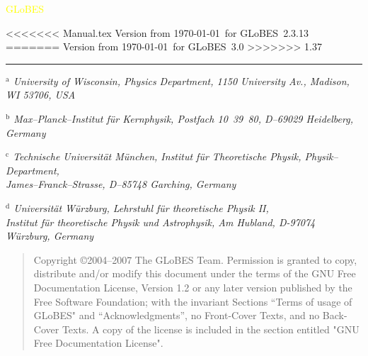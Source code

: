 \documentclass[a4paper,12pt,twoside]{book}
\newcommand{\GLOBES}{{\sf GLoBES}}
\begin{document}
{\begin{center}
\vspace*{-1cm}

{\Huge \textcolor{yellow}{GLoBES}}
\end{center}

\vspace{1cm}

\begin{center}
<<<<<<< Manual.tex
Version from \today\ for \GLOBES\ 2.3.13
=======
Version from \today\ for \GLOBES\ 3.0
>>>>>>> 1.37
\end{center}


\vspace*{0.5cm}
\vfill
\hrule

\vspace*{0.1cm}

{\em\small $^{\mathrm{a}}$%
       University of Wisconsin,  Physics Department,
       1150 University Av., Madison, WI 53706, USA}

{\em\small $^{\mathrm{b}}$%
       Max--Planck--Institut f\"ur Kernphysik, 
       Postfach 10~39~80, D--69029 Heidelberg, Germany} 

{\em\small $^{\mathrm{c}}$%
       Technische Universit\"at M\"unchen,
       Institut f\"ur Theoretische Physik, Physik--Department,\\
       James--Franck--Strasse, D--85748 Garching, Germany}

{\em\small $^{\mathrm{d}}$%
       Universit\"at W\"urzburg, 
       Lehrstuhl f\"ur theoretische Physik II, \\
       Institut f\"ur theoretische Physik und Astrophysik, 
       Am Hubland,
       D-97074 W\"urzburg, Germany}



}


\clearpage
\thispagestyle{empty}
\bigskip
\begin{quote}
    Copyright \copyright  2004--2007  The GLoBES Team.
    Permission is granted to copy, distribute and/or modify this document
    under the terms of the GNU Free Documentation License, Version 1.2
    or any later version published by the Free Software Foundation;
    with the invariant Sections ``Terms of usage of \GLOBES" 
    and ``Acknowledgments'', no Front-Cover Texts, and no Back-Cover Texts.
    A copy of the license is included in the section entitled "GNU
    Free Documentation License".
\end{quote}
\bigskip
    
\end{document}
